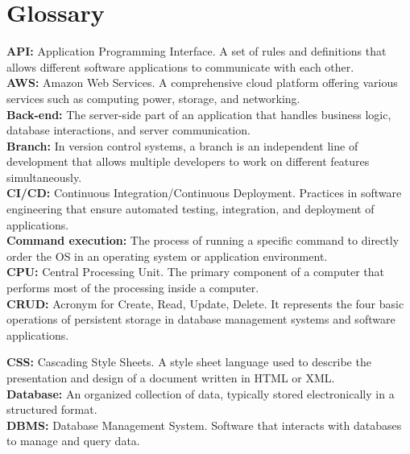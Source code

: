 \section{Glossary}

\textbf{API:} Application Programming Interface. A set of rules and definitions that allows different software applications to communicate with each other.\\

\textbf{AWS:} Amazon Web Services. A comprehensive cloud platform offering various services such as computing power, storage, and networking.\\

\textbf{Back-end:} The server-side part of an application that handles business logic, database interactions, and server communication.\\

\textbf{Branch:} In version control systems, a branch is an independent line of development that allows multiple developers to work on different features simultaneously.\\

\textbf{CI/CD:} Continuous Integration/Continuous Deployment. Practices in software engineering that ensure automated testing, integration, and deployment of applications.\\

\textbf{Command execution:} The process of running a specific command to directly order the OS in an operating system or application environment.\\

\textbf{CPU:} Central Processing Unit. The primary component of a computer that performs most of the processing inside a computer.\\

\textbf{CRUD:} Acronym for Create, Read, Update, Delete. It represents the four basic operations of persistent storage in database management systems and software applications.

\textbf{CSS:} Cascading Style Sheets. A style sheet language used to describe the presentation and design of a document written in HTML or XML.\\

\textbf{Database:} An organized collection of data, typically stored electronically in a structured format.\\

\textbf{DBMS:} Database Management System. Software that interacts with databases to manage and query data.\\

